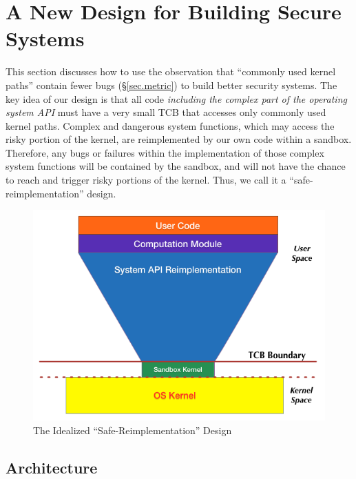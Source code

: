 \section{A New Design for Building Secure Systems}
\label{sec.design}

This section discusses how to use the observation
 that ``commonly used kernel paths'' contain fewer bugs 
(\S{\ref{sec.metric}}) to build better security systems.
The key idea of our design is that all code \emph{including the complex part
of the operating system API} must have a very small TCB that accesses only 
commonly used kernel paths. 
Complex and dangerous system functions, which may access the risky portion of the kernel, 
are reimplemented by our own code within a sandbox. 
Therefore, any bugs or failures within the implementation of those complex system functions 
will be contained by the sandbox, and will not have the chance to reach 
and trigger risky portions of the kernel. Thus, we call it a ``safe-reimplementation'' design.

\begin{figure}%
\centering
\includegraphics[width=1.0\columnwidth]{diagram/lind_secure_design.png}
\caption{The Idealized ``Safe-Reimplementation'' Design }
\label{fig:design}
\end{figure}

\subsection{Architecture}

